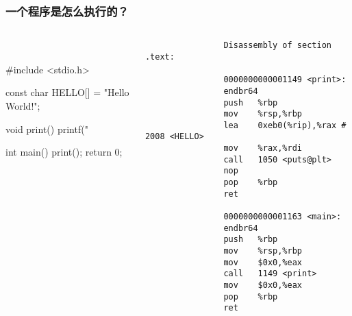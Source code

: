 \documentclass[UTF8,lualatex]{ctexbeamer}
\begin{document}
\begin{frame}[fragile]
    \frametitle{一个程序是怎么执行的？}
    \scriptsize
    \begin{columns}[t]
        \begin{column}{.45\textwidth}
            \begin{block}{~}
            \begin{cppcode}
                #include <stdio.h>

                const char HELLO[]
                    = "Hello World!";

                void print() {
                    printf("%
                }

                int main() {
                    print();
                    return 0;
                }
            \end{cppcode}
            \end{block}
        \end{column}
        \begin{column}{.5\textwidth}
            \begin{verbatim}
                Disassembly of section .text:

                0000000000001149 <print>:
                endbr64
                push   %rbp
                mov    %rsp,%rbp
                lea    0xeb0(%rip),%rax # 2008 <HELLO>
                mov    %rax,%rdi
                call   1050 <puts@plt>
                nop
                pop    %rbp
                ret

                0000000000001163 <main>:
                endbr64
                push   %rbp
                mov    %rsp,%rbp
                mov    $0x0,%eax
                call   1149 <print>
                mov    $0x0,%eax
                pop    %rbp
                ret
            \end{verbatim}
        \end{column}
    \end{columns}
\end{frame}

\end{document}
